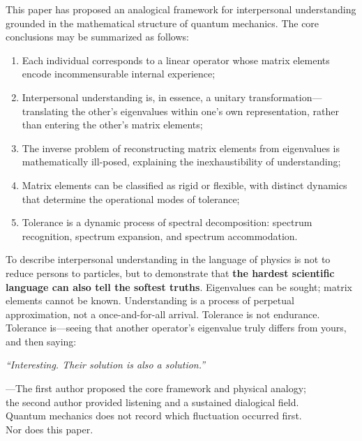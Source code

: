 ﻿\documentclass[11pt,a4paper]{article}
\begin{document}
This paper has proposed an analogical framework for interpersonal understanding grounded in the mathematical structure of quantum mechanics. The core conclusions may be summarized as follows:

\begin{enumerate}[label=(\arabic*)]
    \item Each individual corresponds to a linear operator whose matrix elements encode incommensurable internal experience;
    \item Interpersonal understanding is, in essence, a unitary transformation---translating the other's eigenvalues within one's own representation, rather than entering the other's matrix elements;
    \item The inverse problem of reconstructing matrix elements from eigenvalues is mathematically ill-posed, explaining the inexhaustibility of understanding;
    \item Matrix elements can be classified as rigid or flexible, with distinct dynamics that determine the operational modes of tolerance;
    \item Tolerance is a dynamic process of spectral decomposition: spectrum recognition, spectrum expansion, and spectrum accommodation.
\end{enumerate}

To describe interpersonal understanding in the language of physics is not to reduce persons to particles, but to demonstrate that \textbf{the hardest scientific language can also tell the softest truths}. Eigenvalues can be sought; matrix elements cannot be known. Understanding is a process of perpetual approximation, not a once-and-for-all arrival. Tolerance is not endurance. Tolerance is---seeing that another operator's eigenvalue truly differs from yours, and then saying:

\begin{center}
\textit{``Interesting. Their solution is also a solution.''}
\end{center}

\bigskip
\begin{flushright}
---The first author proposed the core framework and physical analogy;\\
the second author provided listening and a sustained dialogical field.\\
Quantum mechanics does not record which fluctuation occurred first.\\
Nor does this paper.
\end{flushright}
\end{document}
